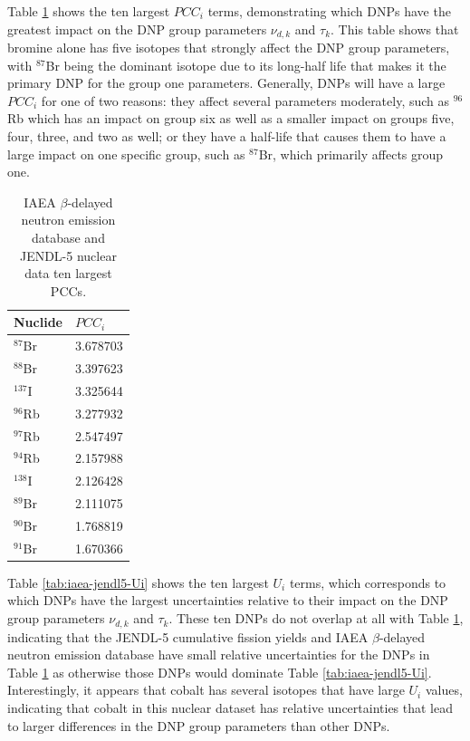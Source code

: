 Table \ref{tab:iaea-jendl5-PCCi} shows the ten largest $PCC_i$ terms, demonstrating which \glspl{DNP} have the greatest impact on the \gls{DNP} group parameters $\nu_{d,k}$ and $\tau_k$.
This table shows that bromine alone has five isotopes that strongly affect the \gls{DNP} group parameters, with $^{87}$Br being the dominant isotope due to its long-half life that makes it the primary \gls{DNP} for the group one parameters.
Generally, \glspl{DNP} will have a large $PCC_i$ for one of two reasons: they affect several parameters moderately, such as $^{96}$Rb which has an impact on group six as well as a smaller impact on groups five, four, three, and two as well; or they have a half-life that causes them to have a large impact on one specific group, such as $^{87}$Br, which primarily affects group one.

\begin{table}[]
    \centering
    \caption{IAEA $\beta$-delayed neutron emission database and JENDL-5 nuclear data ten largest \glspl{PCC}.}
    \begin{tabular}{ll}
        \hline
       Nuclide & $PCC_{i}$ \\
       \hline
       $^{87}$Br & 3.678703 \\
       $^{88}$Br & 3.397623 \\
       $^{137}$I & 3.325644 \\
       $^{96}$Rb & 3.277932 \\
       $^{97}$Rb & 2.547497 \\
       $^{94}$Rb & 2.157988 \\
       $^{138}$I & 2.126428 \\
       $^{89}$Br & 2.111075 \\
       $^{90}$Br & 1.768819 \\
       $^{91}$Br & 1.670366 \\
        \hline
    \end{tabular}
    \label{tab:iaea-jendl5-PCCi}
\end{table}

Table \ref{tab:iaea-jendl5-Ui} shows the ten largest $U_i$ terms, which corresponds to which \glspl{DNP} have the largest uncertainties relative to their impact on the \gls{DNP} group parameters $\nu_{d,k}$ and $\tau_k$.
These ten \glspl{DNP} do not overlap at all with Table \ref{tab:iaea-jendl5-PCCi}, indicating that the JENDL-5 cumulative fission yields and IAEA $\beta$-delayed neutron emission database have small relative uncertainties for the \glspl{DNP} in Table \ref{tab:iaea-jendl5-PCCi} as otherwise those \glspl{DNP} would dominate Table \ref{tab:iaea-jendl5-Ui}.
Interestingly, it appears that cobalt has several isotopes that have large $U_i$ values, indicating that cobalt in this nuclear dataset has relative uncertainties that lead to larger differences in the \gls{DNP} group parameters than other \glspl{DNP}.

